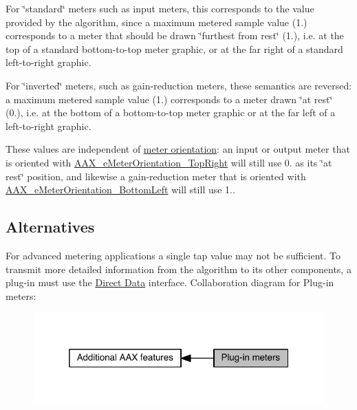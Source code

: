 \begin{DoxyItemize}
\item For \char`\"{}standard\char`\"{} meters such as input meters, this corresponds to the value provided by the algorithm, since a maximum metered sample value (1.) corresponds to a meter that should be drawn \char`\"{}furthest from rest\char`\"{} (1.), i.\+e. at the top of a standard bottom-\/to-\/top meter graphic, or at the far right of a standard left-\/to-\/right graphic. \item For \char`\"{}inverted\char`\"{} meters, such as gain-\/reduction meters, these semantics are reversed\+: a maximum metered sample value (1.) corresponds to a meter drawn \char`\"{}at rest\char`\"{} (0.), i.\+e. at the bottom of a bottom-\/to-\/top meter graphic or at the far left of a left-\/to-\/right graphic.\end{DoxyItemize}
These values are independent of \hyperlink{a00206_af260f0f9a6bff0f7bfd3200b2947c96b}{meter orientation}\+: an input or output meter that is oriented with \hyperlink{a00206_af260f0f9a6bff0f7bfd3200b2947c96ba0b672f16509ea26e7374306bbb2e1e07}{A\+A\+X\+\_\+e\+Meter\+Orientation\+\_\+\+Top\+Right} will still use 0. as its \char`\"{}at rest\char`\"{} position, and likewise a gain-\/reduction meter that is oriented with \hyperlink{a00206_af260f0f9a6bff0f7bfd3200b2947c96bad6b506082c761babe2cefe133d326e32}{A\+A\+X\+\_\+e\+Meter\+Orientation\+\_\+\+Bottom\+Left} will still use 1..\hypertarget{a00337_AdditionalFeatures_Meters_alternatives}{}\subsection{Alternatives}\label{a00337_AdditionalFeatures_Meters_alternatives}
For advanced metering applications a single tap value may not be sufficient. To transmit more detailed information from the algorithm to its other components, a plug-\/in must use the \hyperlink{a00333}{Direct Data} interface. Collaboration diagram for Plug-\/in meters\+:
\nopagebreak
\begin{figure}[H]
\begin{center}
\leavevmode
\includegraphics[width=319pt]{a00337}
\end{center}
\end{figure}
